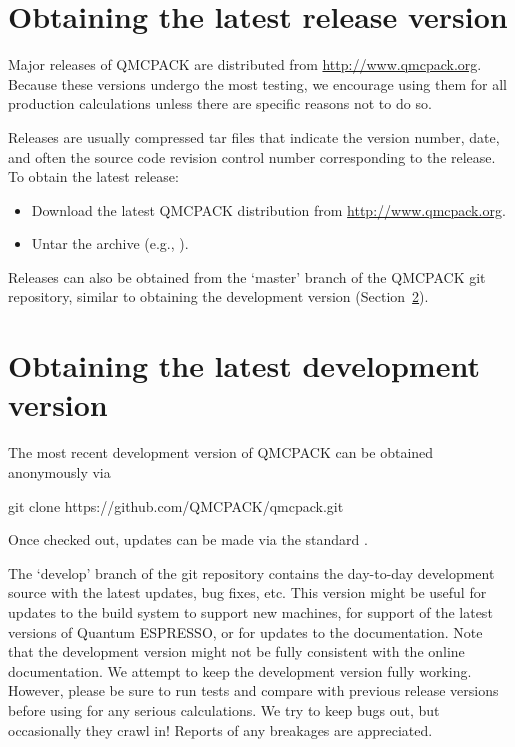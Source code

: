 \section{Obtaining the latest release version}
\label{sec:obrelease}
Major releases of QMCPACK are distributed from
\url{http://www.qmcpack.org}. Because these versions undergo the most testing, we encourage using them for all production calculations unless there are specific reasons not to do so.

Releases are usually compressed tar files that indicate the version
number, date, and often the source code revision control number
corresponding to the release. To obtain the latest release: 

\begin{itemize}
\item Download the latest QMCPACK distribution from \url{http://www.qmcpack.org}.
\item Untar the archive (e.g., ).
\end{itemize}

Releases can also be obtained from the `master' branch of the QMCPACK
git repository, similar to obtaining the development version (Section~\ref{sec:obdevelopment}).

\section{Obtaining the latest development version}
\label{sec:obdevelopment}
The most recent development version of QMCPACK can be obtained anonymously via
\begin{shade}
git clone https://github.com/QMCPACK/qmcpack.git
\end{shade}
Once checked out,
updates can be made via the standard .

The `develop' branch of the git repository contains the day-to-day development source
with the latest updates, bug fixes, etc. This version might be useful
for updates to the build system to support new machines, for support
of the latest versions of Quantum ESPRESSO, or for updates to the
documentation.  Note that the development version might not be fully
consistent with the online documentation.  We attempt to keep
the development version fully working. However, please be sure to run tests and
compare with previous release versions before using for any serious
calculations. We try to keep bugs out, but occasionally they crawl
in! Reports of any breakages are appreciated.

